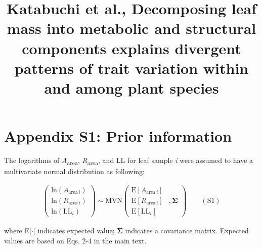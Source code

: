 \documentclass[
  12pt,
  letterpaper,
  DIV=11,
  numbers=noendperiod]{scrartcl}
\title{Katabuchi et al., Decomposing leaf mass into metabolic and
structural components explains divergent patterns of trait variation
within and among plant species}
\author{}
\date{}
\renewcommand*\contentsname{Table of contents}
\newcommand\contentsname{Table of contents}
\begin{document}
\maketitle
\ifdefined\Shaded\renewenvironment{Shaded}{\begin{tcolorbox}[sharp corners, boxrule=0pt, enhanced, breakable, interior hidden, frame hidden, borderline west={3pt}{0pt}{shadecolor}]}{\end{tcolorbox}}\fi

\renewcommand*\contentsname{Table of contents}
{
\hypersetup{linkcolor=}
\setcounter{tocdepth}{3}
\tableofcontents
}
\newpage

\hypertarget{appendix-s1-prior-information}{%
\section{Appendix S1: Prior
information}\label{appendix-s1-prior-information}}

The logarithms of \emph{A}\textsubscript{area},
\emph{R}\textsubscript{area}, and LL for leaf sample \emph{i} were
assumed to have a multivariate normal distribution as following:

\[
\begin{aligned}
\left(
\begin{array}{ccc}
\mathrm{ln}(A_{\mathrm{area} \, i})\\
\mathrm{ln}(R_{\mathrm{area} \, i}) \\
\mathrm{ln}(\mathrm{LL}_i)
\end{array}
\right)
\sim \mathrm{MVN}
\left(
\begin{array}{rrr}
\mathrm{E}[A_{\mathrm{area} \, i}] & \\
\mathrm{E}[R_{\mathrm{area} \, i}] &, \boldsymbol{\Sigma}\\
\mathrm{E}[\mathrm{LL}_i] &
\end{array}
\right) \qquad(\mathrm{S}1)
\end{aligned}
\]

where E{[}\(\cdot\){]} indicates expected value; \(\boldsymbol{\Sigma}\)
indicates a covariance matrix. Expected values are based on Eqs. 2-4 in
the main text.
\end{document}
